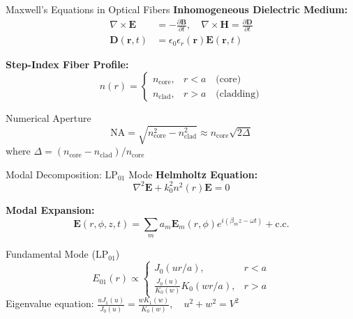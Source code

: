 \documentclass[aspectratio=169,12pt]{beamer}
\begin{document}
\begin{frame}{Maxwell's Equations in Optical Fibers}
\textbf{Inhomogeneous Dielectric Medium:}
\begin{align*}
\nabla \times \mathbf{E} &= -\frac{\partial \mathbf{B}}{\partial t}, \quad \nabla \times \mathbf{H} = \frac{\partial \mathbf{D}}{\partial t} \\
\mathbf{D}(\mathbf{r},t) &= \epsilon_0 \epsilon_r(\mathbf{r}) \mathbf{E}(\mathbf{r},t)
\end{align*}

\vspace{0.3cm}

\textbf{Step-Index Fiber Profile:}
\begin{equation*}
n(r) = 
\begin{cases}
n_{\text{core}}, & r < a \quad \text{(core)} \\
n_{\text{clad}}, & r > a \quad \text{(cladding)}
\end{cases}
\end{equation*}

\vspace{0.2cm}

\begin{block}{Numerical Aperture}
$$\mathrm{NA} = \sqrt{n_{\text{core}}^2 - n_{\text{clad}}^2} \approx n_{\text{core}}\sqrt{2\Delta}$$
where $\Delta = (n_{\text{core}} - n_{\text{clad}})/n_{\text{core}}$
\end{block}
\end{frame}

\begin{frame}{Modal Decomposition: LP$_{01}$ Mode}
\textbf{Helmholtz Equation:}
$$\nabla^2 \mathbf{E} + k_0^2 n^2(r) \mathbf{E} = 0$$

\vspace{0.3cm}

\textbf{Modal Expansion:}
$$\mathbf{E}(r,\phi,z,t) = \sum_m a_m \mathbf{E}_m(r,\phi) e^{i(\beta_m z - \omega t)} + \text{c.c.}$$

\vspace{0.3cm}

\begin{alertblock}{Fundamental Mode (LP$_{01}$)}
\begin{equation*}
E_{01}(r) \propto 
\begin{cases}
J_0(u r/a), & r < a \\
\frac{J_0(u)}{K_0(w)} K_0(w r/a), & r > a
\end{cases}
\end{equation*}
Eigenvalue equation: $\displaystyle\frac{u J_1(u)}{J_0(u)} = \frac{w K_1(w)}{K_0(w)}, \quad u^2 + w^2 = V^2$
\end{alertblock}
\end{frame}
\end{document}
